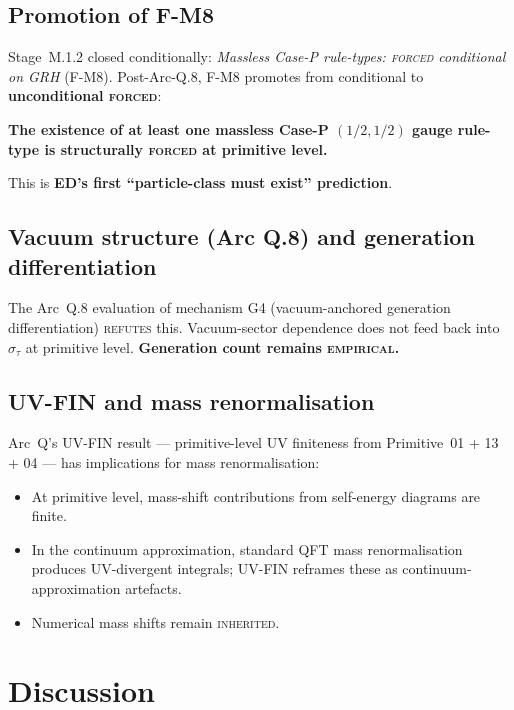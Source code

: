 \documentclass[11pt,a4paper]{article}
\begin{document}
\subsection{Promotion of F-M8}

Stage~M.1.2 closed conditionally: \emph{Massless Case-P rule-types: \textsc{forced} conditional on GRH} (F-M8). Post-Arc-Q.8, F-M8 promotes from conditional to \textbf{unconditional \textsc{forced}}:

\begin{center}
\textbf{The existence of at least one massless Case-P $(1/2, 1/2)$ gauge rule-type is structurally \textsc{forced} at primitive level.}
\end{center}

This is \textbf{ED's first ``particle-class must exist'' prediction}.

\subsection{Vacuum structure (Arc Q.8) and generation differentiation}

The Arc~Q.8 evaluation of mechanism G4 (vacuum-anchored generation differentiation) \textsc{refutes} this. Vacuum-sector dependence does not feed back into $\sigma_\tau$ at primitive level. \textbf{Generation count remains \textsc{empirical}.}

\subsection{UV-FIN and mass renormalisation}

Arc~Q's UV-FIN result --- primitive-level UV finiteness from Primitive~01 + 13 + 04 --- has implications for mass renormalisation:
\begin{itemize}
  \item At primitive level, mass-shift contributions from self-energy diagrams are finite.
  \item In the continuum approximation, standard QFT mass renormalisation produces UV-divergent integrals; UV-FIN reframes these as continuum-approximation artefacts.
  \item Numerical mass shifts remain \textsc{inherited}.
\end{itemize}

\section{Discussion}
\end{document}
